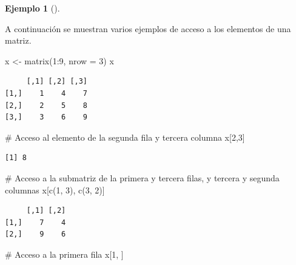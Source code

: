 \documentclass[
  a4paper,
]{scrreport}
\newenvironment{Shaded}{\begin{snugshade}}{\end{snugshade}}
\newcommand{\AttributeTok}[1]{\textcolor[rgb]{0.40,0.45,0.13}{#1}}
\newcommand{\CommentTok}[1]{\textcolor[rgb]{0.37,0.37,0.37}{#1}}
\newcommand{\DecValTok}[1]{\textcolor[rgb]{0.68,0.00,0.00}{#1}}
\newcommand{\FunctionTok}[1]{\textcolor[rgb]{0.28,0.35,0.67}{#1}}
\newcommand{\NormalTok}[1]{\textcolor[rgb]{0.00,0.23,0.31}{#1}}
\newcommand{\OtherTok}[1]{\textcolor[rgb]{0.00,0.23,0.31}{#1}}
\newcommand{\SpecialCharTok}[1]{\textcolor[rgb]{0.37,0.37,0.37}{#1}}
\theoremstyle{definition}
\theoremstyle{definition}
\newtheorem{example}{Ejemplo}[chapter]
\theoremstyle{remark}
\begin{document}
\leavevmode{}%
\begin{example}[]\label{exm-acceso-matriz}

A continuación se muestran varios ejemplos de acceso a los elementos de
una matriz.

\begin{Shaded}
\begin{Highlighting}[]
\NormalTok{x }\OtherTok{\textless{}{-}} \FunctionTok{matrix}\NormalTok{(}\DecValTok{1}\SpecialCharTok{:}\DecValTok{9}\NormalTok{, }\AttributeTok{nrow =} \DecValTok{3}\NormalTok{)}
\NormalTok{x}
\end{Highlighting}
\end{Shaded}

\begin{verbatim}
     [,1] [,2] [,3]
[1,]    1    4    7
[2,]    2    5    8
[3,]    3    6    9
\end{verbatim}

\begin{Shaded}
\begin{Highlighting}[]
\CommentTok{\# Acceso al elemento de la segunda fila y tercera columna}
\NormalTok{x[}\DecValTok{2}\NormalTok{,}\DecValTok{3}\NormalTok{]}
\end{Highlighting}
\end{Shaded}

\begin{verbatim}
[1] 8
\end{verbatim}

\begin{Shaded}
\begin{Highlighting}[]
\CommentTok{\# Acceso a la submatriz de la primera y tercera filas, y tercera y segunda columnas}
\NormalTok{x[}\FunctionTok{c}\NormalTok{(}\DecValTok{1}\NormalTok{, }\DecValTok{3}\NormalTok{), }\FunctionTok{c}\NormalTok{(}\DecValTok{3}\NormalTok{, }\DecValTok{2}\NormalTok{)]}
\end{Highlighting}
\end{Shaded}

\begin{verbatim}
     [,1] [,2]
[1,]    7    4
[2,]    9    6
\end{verbatim}

\begin{Shaded}
\begin{Highlighting}[]
\CommentTok{\# Acceso a la primera fila}
\NormalTok{x[}\DecValTok{1}\NormalTok{, ]}
\end{Highlighting}
\end{Shaded}


\end{example}
\end{document}
